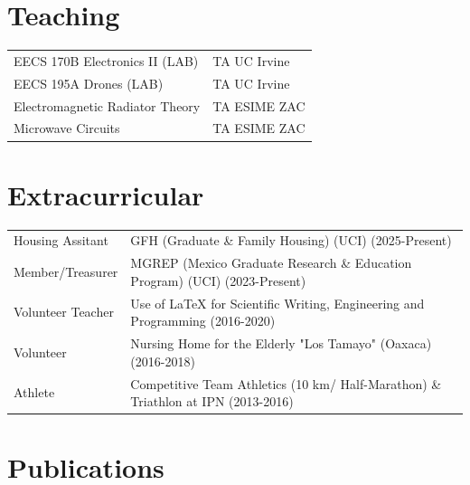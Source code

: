 \documentclass[letterpaper,10pt]{article}
\begin{document}
\section{Teaching}
\begin{tabularx}{\linewidth}{@{}l X@{}}
EECS 170B Electronics II (LAB)& TA UC Irvine\\
EECS 195A Drones (LAB)& TA UC Irvine\\
Electromagnetic Radiator Theory & TA ESIME ZAC\\
Microwave Circuits & TA ESIME ZAC\\
\end{tabularx}
\section{Extracurricular}
\begin{tabularx}{\linewidth}{@{}l X@{}}
Housing Assitant & GFH (Graduate \& Family Housing) (UCI) (2025-Present)\\
Member/Treasurer & MGREP (Mexico Graduate Research \& Education Program) (UCI) (2023-Present) \\
Volunteer Teacher & Use of LaTeX for Scientific Writing, Engineering and Programming (2016-2020) \\
Volunteer & Nursing Home for the Elderly "Los Tamayo" (Oaxaca) (2016-2018)\\
Athlete & Competitive Team Athletics (10 km/ Half-Marathon) \& Triathlon at IPN (2013-2016)\\
\end{tabularx}
\section{Publications}
\begin{refsection}
\nocite{*}
\printbibliography[heading=none]
\end{refsection}


\vfill
{}
\end{document}
